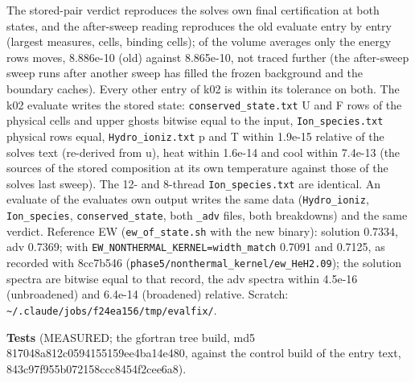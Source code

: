 \documentclass[english,a4paper]{my_memo}
\begin{document}
The stored-pair verdict reproduces the solve\textquotesingle s own final certification at
both states, and the after-sweep reading reproduces the old evaluate entry by
entry (largest measures, cells, binding cells); of the volume averages only
the energy row\textquotesingle s moves, 8.886e-10 (old) against 8.865e-10, not traced
further (the after-sweep sweep runs after another sweep has filled the
frozen background and the boundary caches). Every
other entry of k02 is within its tolerance on both. The k02 evaluate writes
the stored state: \texttt{conserved\_state.txt} U and F rows of the physical cells
and upper ghosts bitwise equal to the input, \texttt{Ion\_species.txt} physical rows
equal, \texttt{Hydro\_ioniz.txt} p and T within 1.9e-15 relative of the solve\textquotesingle s text
(re-derived from u), heat within 1.6e-14 and cool within 7.4e-13 (the sources
of the stored composition at its own temperature against those of the
solve\textquotesingle s last sweep). The 12- and 8-thread \texttt{Ion\_species.txt} are identical.
An evaluate of the evaluate\textquotesingle s own output writes the same data
(\texttt{Hydro\_ioniz}, \texttt{Ion\_species}, \texttt{conserved\_state}, both \texttt{\_adv} files, both
breakdowns) and the same verdict. Reference EW (\texttt{ew\_of\_state.sh} with the new
binary): solution 0.7334, adv 0.7369; with \texttt{EW\_NONTHERMAL\_KERNEL=width\_match}
0.7091 and 0.7125, as recorded with 8cc7b546
(\texttt{phase5/nonthermal\_kernel/ew\_HeH2.09}); the solution spectra are bitwise
equal to that record, the adv spectra within 4.5e-16 (unbroadened) and
6.4e-14 (broadened) relative. Scratch:
\texttt{\textasciitilde{}/.claude/jobs/f24ea156/tmp/evalfix/}.

\textbf{Tests} (MEASURED; the gfortran tree build, md5 817048a812c0594155159ee4ba14e480, against the control build of the entry text, 843c97f955b072158ccc8454f2cee6a8).
\end{document}
